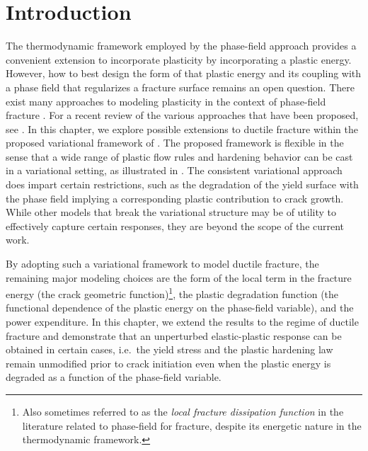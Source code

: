\section{Introduction}
\label{section: ductile/intro}


The thermodynamic framework employed by the phase-field approach provides a convenient extension to incorporate plasticity by incorporating a plastic energy. However, how to best design the form of that plastic energy and its coupling with a phase field that regularizes a fracture surface remains an open question.
There exist many approaches to modeling plasticity in the context of phase-field fracture \cite{alessi_gradient_2014, alessi_gradient_2015, alessi_coupling_2018, ambati_phase-field_2015, ambati2016phase, miehe_phase_2016, borden2016phase, borden_phase-field_2017}.  For a recent review of the various approaches that have been proposed, see  \citet{alessi_comparison_2017}. In this chapter, we explore possible extensions to ductile fracture within the proposed variational framework of . The proposed framework is flexible in the sense that a wide range of plastic flow rules and hardening behavior can be cast in a variational setting, as illustrated in \cite{ortiz_variational_1999}.  The consistent variational approach does impart certain restrictions, such as the degradation of the yield surface with the phase field implying a corresponding plastic contribution to crack growth.  While other models that break the variational structure may be of utility to effectively capture certain responses, they are beyond the scope of the current work.


By adopting such a variational framework to model ductile fracture, the remaining major modeling choices are the form of the local term in the fracture energy (the crack geometric function)\footnote{Also sometimes referred to as the \textit{local fracture dissipation function} in the literature related to phase-field for fracture, despite its energetic nature in the thermodynamic framework.}, the plastic degradation function (the functional dependence of the plastic energy on the phase-field variable), and the power expenditure. In this chapter, we extend the results to the regime of ductile fracture and demonstrate that an unperturbed elastic-plastic response can be obtained in certain cases, i.e.\ the yield stress and the plastic hardening law remain unmodified prior to crack initiation even when the plastic energy is degraded as a function of the phase-field variable.

